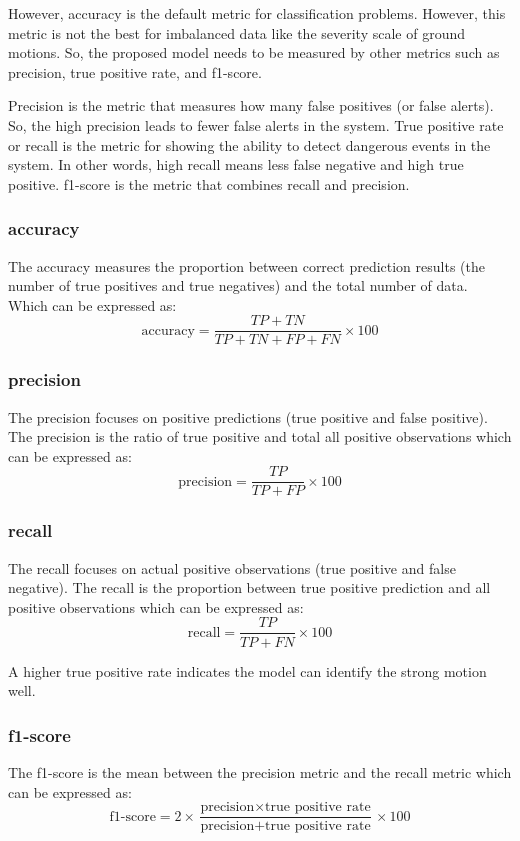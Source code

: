 However, accuracy is the default metric for classification problems. However, this metric is not the best for imbalanced data like the severity scale of
ground motions. So, the proposed model needs to be measured by other metrics such as precision, true positive rate, and f1-score.

 Precision is the metric that measures how many false positives (or false alerts). So, the high precision leads to fewer false alerts in the system. True positive rate or recall is the metric for showing the ability to detect dangerous events in the system. In other words, high recall means less false negative and high true positive. f1-score is the metric that combines recall and precision.  
 
\subsubsection{accuracy}
The accuracy measures the proportion between correct prediction results (the number of true positives and true negatives) and the total number of data. Which can be expressed as:
$$\text{accuracy} = \frac{TP + TN}{TP + TN + FP + FN}\times 100$$

\subsubsection{precision}
The precision focuses on positive predictions (true positive and false positive). The precision is the ratio of true positive and total all positive observations which can be expressed as:
$$\text{precision} = \frac{TP}{TP + FP}\times 100$$

\subsubsection{recall}
The recall focuses on actual positive observations (true positive and false negative). The recall is the proportion between true positive prediction and all positive observations which can be expressed as:
$$\text{recall} = \frac{TP}{TP + FN}\times 100$$

A higher true positive rate indicates the model can identify the strong motion well.

\subsubsection{f1-score}
The f1-score is the mean between the precision metric and the recall metric  which can be expressed as:
$$\text{f1-score} = 2 \times \frac{\text{precision} \times \text{true positive rate}}{\text{precision} + \text{true positive rate}}\times 100$$

